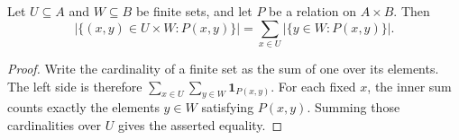 \begin{lemma}
Let $U\subseteq A$ and $W\subseteq B$ be finite sets, and let $P$ be a relation on $A\times B$.
Then
\[
 |\{(x,y)\in U\times W:P(x,y)\}|=
 \sum_{x\in U}|\{y\in W:P(x,y)\}|.
\]
\end{lemma}
\begin{proof}
Write the cardinality of a finite set as the sum of one over its elements.
The left side is therefore $\sum_{x\in U}\sum_{y\in W}\mathbf1_{P(x,y)}$.
For each fixed $x$, the inner sum counts exactly the elements $y\in W$ satisfying $P(x,y)$.
Summing those cardinalities over $U$ gives the asserted equality.
\end{proof}
